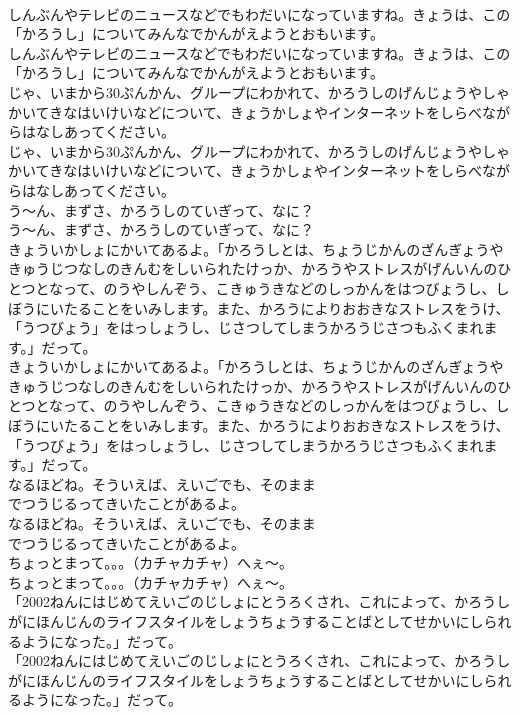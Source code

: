 \documentclass[8pt]{extreport}
\begin{document}
\begin{CJK}{UTF8}{min}
\\	しんぶんやテレビのニュースなどでもわだいになっていますね。きょうは、この「かろうし」についてみんなでかんがえようとおもいます。
\\	しんぶんやテレビのニュースなどでもわだいになっていますね。きょうは、この「かろうし」についてみんなでかんがえようとおもいます。
\\	じゃ、いまから30ぷんかん、グループにわかれて、かろうしのげんじょうやしゃかいてきなはいけいなどについて、きょうかしょやインターネットをしらべながらはなしあってください。
\\	じゃ、いまから30ぷんかん、グループにわかれて、かろうしのげんじょうやしゃかいてきなはいけいなどについて、きょうかしょやインターネットをしらべながらはなしあってください。
\\	う～ん、まずさ、かろうしのていぎって、なに？
\\	う～ん、まずさ、かろうしのていぎって、なに？
\\	きょういかしょにかいてあるよ。「かろうしとは、ちょうじかんのざんぎょうやきゅうじつなしのきんむをしいられたけっか、かろうやストレスがげんいんのひとつとなって、のうやしんぞう、こきゅうきなどのしっかんをはつびょうし、しぼうにいたることをいみします。また、かろうによりおおきなストレスをうけ、「うつびょう」をはっしょうし、じさつしてしまうかろうじさつもふくまれます。」だって。
\\	きょういかしょにかいてあるよ。「かろうしとは、ちょうじかんのざんぎょうやきゅうじつなしのきんむをしいられたけっか、かろうやストレスがげんいんのひとつとなって、のうやしんぞう、こきゅうきなどのしっかんをはつびょうし、しぼうにいたることをいみします。また、かろうによりおおきなストレスをうけ、「うつびょう」をはっしょうし、じさつしてしまうかろうじさつもふくまれます。」だって。
\\	なるほどね。そういえば、えいごでも、そのまま 
\\	でつうじるってきいたことがあるよ。
\\	なるほどね。そういえば、えいごでも、そのまま 
\\	でつうじるってきいたことがあるよ。
\\	ちょっとまって。。。（カチャカチャ）へぇ～。
\\	ちょっとまって。。。（カチャカチャ）へぇ～。
\\	「2002ねんにはじめてえいごのじしょにとうろくされ、これによって、かろうしがにほんじんのライフスタイルをしょうちょうすることばとしてせかいにしられるようになった。」だって。
\\	「2002ねんにはじめてえいごのじしょにとうろくされ、これによって、かろうしがにほんじんのライフスタイルをしょうちょうすることばとしてせかいにしられるようになった。」だって。

\end{CJK}
\end{document}

